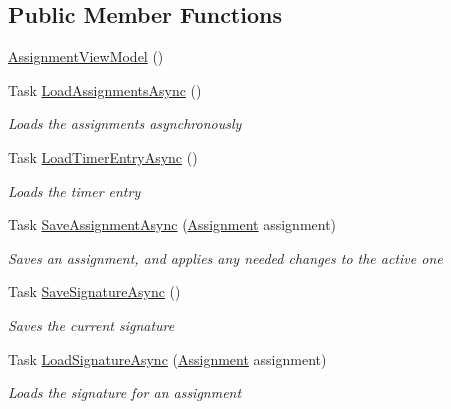 \subsection*{Public Member Functions}
\begin{DoxyCompactItemize}
\item 
\hyperlink{class_field_service_1_1_view_models_1_1_assignment_view_model_a9cb65487d776beaa6b358bae1912bb44}{Assignment\+View\+Model} ()
\item 
Task \hyperlink{class_field_service_1_1_view_models_1_1_assignment_view_model_a90e64bf6cd2a0a7925670d029e248c9b}{Load\+Assignments\+Async} ()
\begin{DoxyCompactList}\small\item\em Loads the assignments asynchronously \end{DoxyCompactList}\item 
Task \hyperlink{class_field_service_1_1_view_models_1_1_assignment_view_model_ac7215fe40870675e8a614e592549e0d5}{Load\+Timer\+Entry\+Async} ()
\begin{DoxyCompactList}\small\item\em Loads the timer entry \end{DoxyCompactList}\item 
Task \hyperlink{class_field_service_1_1_view_models_1_1_assignment_view_model_a32d10eedcb209fcfef586eecc30b081d}{Save\+Assignment\+Async} (\hyperlink{class_field_service_1_1_data_1_1_assignment}{Assignment} assignment)
\begin{DoxyCompactList}\small\item\em Saves an assignment, and applies any needed changes to the active one \end{DoxyCompactList}\item 
Task \hyperlink{class_field_service_1_1_view_models_1_1_assignment_view_model_a912829fefd8d65c7961b124acf978260}{Save\+Signature\+Async} ()
\begin{DoxyCompactList}\small\item\em Saves the current signature \end{DoxyCompactList}\item 
Task \hyperlink{class_field_service_1_1_view_models_1_1_assignment_view_model_a49f98c2a456c5e68fad8a0ef5babd299}{Load\+Signature\+Async} (\hyperlink{class_field_service_1_1_data_1_1_assignment}{Assignment} assignment)
\begin{DoxyCompactList}\small\item\em Loads the signature for an assignment \end{DoxyCompactList}\item 

\end{DoxyCompactItemize}
